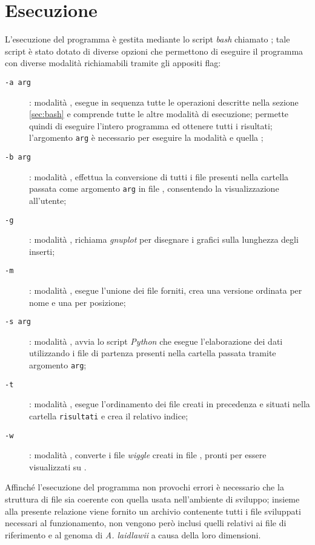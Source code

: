 \section{Esecuzione}
L'esecuzione del programma è gestita mediante lo script \emph{bash} chiamato ; tale script è stato dotato di diverse opzioni che permettono di eseguire il programma con diverse modalità richiamabili tramite gli appositi flag:

\begin{description}
\item[\texttt{-a arg}]: modalità , esegue in sequenza tutte le operazioni descritte nella sezione \ref{sec:bash} e comprende tutte le altre modalità di esecuzione; permette quindi di eseguire l'intero programma ed ottenere tutti i risultati; l'argomento \texttt{arg} è necessario per eseguire la modalità  e quella ;
\item[\texttt{-b arg}]: modalità , effettua la conversione di tutti i file  presenti nella cartella passata come argomento \texttt{arg} in file , consentendo la visualizzazione all'utente;
\item[\texttt{-g}]: modalità , richiama \emph{gnuplot} per disegnare i grafici sulla lunghezza degli inserti;
\item[\texttt{-m}]: modalità , esegue l'unione dei file  forniti, crea una versione ordinata per nome e una per posizione;
\item[\texttt{-s arg}]: modalità , avvia lo script \emph{Python} che esegue l'elaborazione dei dati utilizzando i file  di partenza presenti nella cartella passata tramite argomento \texttt{arg};
\item[\texttt{-t}]: modalità , esegue l'ordinamento dei file  creati in precedenza e situati nella cartella \texttt{risultati} e crea il relativo indice;
\item[\texttt{-w}]: modalità , converte i file \emph{wiggle} creati in file , pronti per essere visualizzati su .
\end{description}

Affinché l'esecuzione del programma non provochi errori è necessario che la struttura di file sia coerente con quella usata nell'ambiente di sviluppo; insieme alla presente relazione viene fornito un archivio contenente tutti i file sviluppati necessari al funzionamento, non vengono però inclusi quelli relativi ai file  di riferimento e al genoma di \emph{A. laidlawii} a causa della loro dimensioni.

